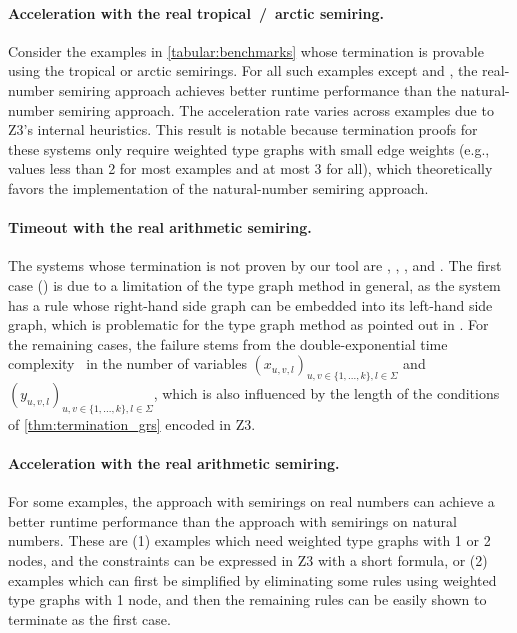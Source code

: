 \paragraph{Acceleration with the real tropical~/~arctic semiring.} 
Consider the examples in \autoref{tabular:benchmarks} whose termination is provable using the tropical or arctic semirings. For all such examples except \cite[Example 5]{plump2018modular} and \cite[Example 4]{bruggink2015proving}, the real-number semiring approach achieves better runtime performance than the natural-number semiring approach. The acceleration rate varies across examples due to Z3's internal heuristics. This result is notable because termination proofs for these systems only require weighted type graphs with small edge weights (e.g., values less than 2 for most examples and at most 3 for all), which theoretically favors the implementation of the natural-number semiring approach.

\paragraph{Timeout with the real arithmetic semiring.}
The systems whose termination is not proven by our tool are \cite[Example 6]{plump2018modular}, \cite[Examples 5 and 6]{bruggink2015proving}, \cite[Example 4]{plump2018modular}, and \cite[Example 5]{bruggink2014termination}.
The first case (\cite[Example 6]{plump2018modular}) is due to a limitation of the type graph method in general, as the system has a rule whose right-hand side graph can be embedded into its left-hand side graph, which is problematic for the type graph method as pointed out in \cite[Example D.4]{endrullis2024generalized_arxiv_v2}. For the remaining cases,
 the failure stems from the double-exponential time complexity~\cite{collins1974quantifier,z3realarithmetic} in the number of variables \( (x_{u,v,l})_{u,v \in \{1,...,k\}, l \in \Sigma} \) and \( (y_{u,v,l})_{u,v \in \{1,...,k\}, l \in \Sigma} \), which is also influenced by the length of the conditions of \autoref{thm:termination_grs} encoded in Z3.
\paragraph{Acceleration with the real arithmetic semiring.} For some examples, the approach with semirings on real numbers can achieve a better runtime performance than the approach with semirings on natural numbers. These are (1) examples which need weighted type graphs with 1 or 2 nodes, and the constraints can be expressed in Z3 with a short formula, or (2) examples which can first be simplified by eliminating some rules using weighted type graphs with 1 node, and then the remaining rules can be 
easily shown to terminate
as the first case.
